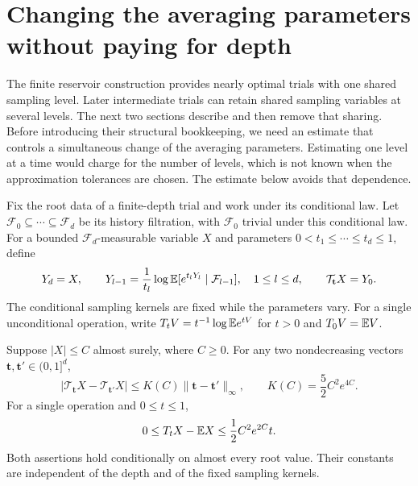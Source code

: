 \section{Changing the averaging parameters without paying for depth}\label{cs:section}

The finite reservoir construction provides nearly optimal trials with one
shared sampling level. Later intermediate trials can retain shared sampling
variables at several levels. The next two sections describe and then remove
that sharing. Before introducing their
structural bookkeeping, we need an estimate that controls a simultaneous
change of the averaging parameters. Estimating one level at a time would
charge for the number of levels, which is not known when the approximation
tolerances are chosen. The estimate below avoids that dependence.

Fix the root data of a finite-depth trial and work under its conditional
law. Let
$\mathcal F_0\subseteq\cdots\subseteq\mathcal F_d$ be its history
filtration, with $\mathcal F_0$ trivial under this conditional law. For a
bounded $\mathcal F_d$-measurable variable $X$ and parameters
$0<t_1\le\cdots\le t_d\le1$, define
\[
 Y_d=X,\qquad
 Y_{l-1}=\frac1{t_l}\log\mathbb E[e^{t_lY_l}\mid\mathcal F_{l-1}],
 \quad 1\le l\le d,
 \qquad \mathcal T_{\mathbf t}X=Y_0.
\]
The conditional sampling kernels are fixed while the parameters vary.
For a single unconditional operation, write
$T_tV=t^{-1}\log\mathbb E e^{tV}$ for $t>0$ and $T_0V=\mathbb E V$.

\begin{lemma}\label{cs:sensitivity}
Suppose $|X|\le C$ almost surely, where $C\ge0$. For any two
nondecreasing vectors $\mathbf t,\mathbf t'\in(0,1]^d$,
\begin{equation}\label{cs:exponent-bound}
 |\mathcal T_{\mathbf t}X-\mathcal T_{\mathbf t'}X|
 \le K(C)\|\mathbf t-\mathbf t'\|_\infty,
 \qquad K(C)=\frac52 C^2e^{4C}.
\end{equation}
For a single operation and $0\le t\le1$,
\begin{equation}\label{cs:small-exponent}
 0\le T_tX-\mathbb E X\le\frac12 C^2e^{2C}t.
\end{equation}
Both assertions hold conditionally on almost every root value. Their
constants are independent of the depth and of the fixed sampling kernels.
\end{lemma}

